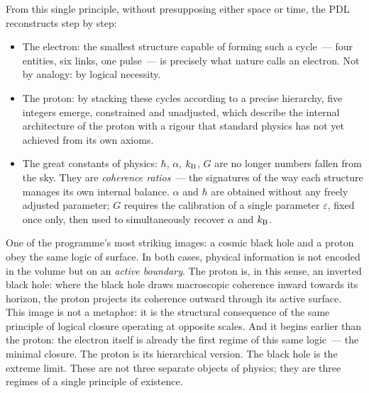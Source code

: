 \documentclass[12pt, a4paper, openright]{book}
\begin{document}
\medskip

From this single principle, without presupposing either space or time, the PDL reconstructs step by step:

\begin{itemize}
\item The electron: the smallest structure capable of forming such a cycle~--- four entities, six links, one pulse~--- is precisely what nature calls an electron. Not by analogy: by logical necessity.
\item The proton: by stacking these cycles according to a precise hierarchy, five integers emerge, constrained and unadjusted, which describe the internal architecture of the proton with a rigour that standard physics has not yet achieved from its own axioms.
\item The great constants of physics: $\hbar$, $\alpha$, $k_{\rm B}$, $G$ are no longer numbers fallen from the sky. They are \emph{coherence ratios}~--- the signatures of the way each structure manages its own internal balance. $\alpha$ and $\hbar$ are obtained without any freely adjusted parameter; $G$ requires the calibration of a single parameter $\varepsilon$, fixed once only, then used to simultaneously recover $\alpha$ and $k_{\rm B}$.
\end{itemize}

One of the programme's most striking images: a cosmic black hole and a proton obey the same logic of surface. In both cases, physical information is not encoded in the volume but on an \emph{active boundary}. The proton is, in this sense, an inverted black hole: where the black hole draws macroscopic coherence inward towards its horizon, the proton projects its coherence outward through its active surface. This image is not a metaphor: it is the structural consequence of the same principle of logical closure operating at opposite scales. And it begins earlier than the proton: the electron itself is already the first regime of this same logic~--- the minimal closure. The proton is its hierarchical version. The black hole is the extreme limit. These are not three separate objects of physics; they are three regimes of a single principle of existence.

\medskip
\end{document}

